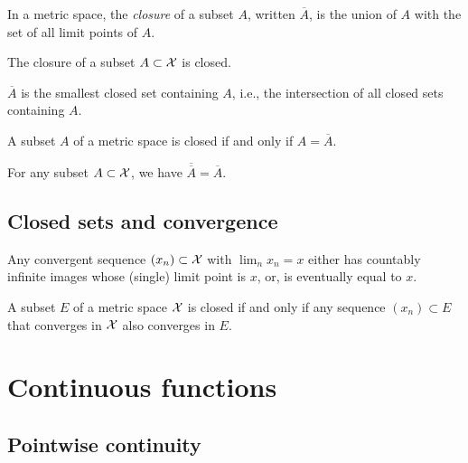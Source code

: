 \begin{defn}
  \label{def:closureInMetricSpace}
  In a metric space, 
  the \emph{closure} of a subset $A$,
  written $\overline{A}$,
  is the union of $A$ with the set of all limit points of $A$. 
\end{defn}

\begin{lem}
  \label{lem:closureIsClosed}
  The closure of a subset $A\subset{\cal X}$ is closed.
\end{lem}

\begin{coro}
  \label{coro:closureBeingSmallest}
  $\overline{A}$ is the smallest closed set containing $A$, 
  i.e., the intersection of all closed sets containing $A$.
\end{coro}

\begin{coro}
  \label{coro:closedFromClosure}
  A subset $A$ of a metric space is closed
  if and only if $A=\overline{A}$.
\end{coro}

\begin{coro}
  \label{coro:closureIdempotence}
  For any subset $A\subset {\cal X}$,
  we have $\overline{\overline{A}}=\overline{A}$. 
\end{coro}


\subsection{Closed sets and convergence}
\label{sec:clos-sets-conv}


\begin{lem}
  \label{lem:converge2cases}
  Any convergent sequence $(x_n)\subset{\cal X}$ with $\lim_n x_n =x$
  either has countably infinite images whose (single) limit point is
  $x$, 
  or, is eventually equal to $x$.
\end{lem}


\begin{lem}
  \label{lem:closedSetConvergence}
  A subset $E$ of a metric space ${\cal X}$ is closed
  if and only if any sequence $(x_n)\subset E$
  that converges in ${\cal X}$ also converges in $E$.
\end{lem}


\section{Continuous functions}

\subsection{Pointwise continuity}

